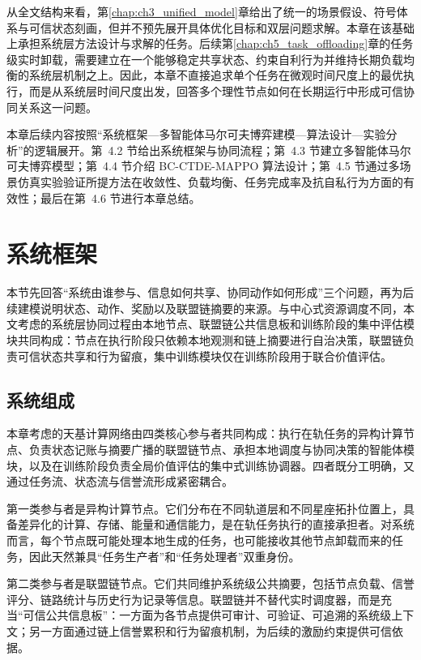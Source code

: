 从全文结构来看，第\ref{chap:ch3_unified_model}章给出了统一的场景假设、符号体系与可信状态刻画，但并不预先展开具体优化目标和双层问题求解。本章在该基础上承担系统层方法设计与求解的任务。后续第\ref{chap:ch5_task_offloading}章的任务级实时卸载，需要建立在一个能够稳定共享状态、约束自利行为并维持长期负载均衡的系统层机制之上。因此，本章不直接追求单个任务在微观时间尺度上的最优执行，而是从系统层时间尺度出发，回答多个理性节点如何在长期运行中形成可信协同关系这一问题。

本章后续内容按照“系统框架—多智能体马尔可夫博弈建模—算法设计—实验分析”的逻辑展开。第~4.2 节给出系统框架与协同流程；第~4.3 节建立多智能体马尔可夫博弈模型；第~4.4 节介绍 BC-CTDE-MAPPO 算法设计；第~4.5 节通过多场景仿真实验验证所提方法在收敛性、负载均衡、任务完成率及抗自私行为方面的有效性；最后在第~4.6 节进行本章总结。


\section{系统框架}

本节先回答“系统由谁参与、信息如何共享、协同动作如何形成”三个问题，再为后续建模说明状态、动作、奖励以及联盟链摘要的来源。与中心式资源调度不同，本文考虑的系统层协同过程由本地节点、联盟链公共信息板和训练阶段的集中评估模块共同构成：节点在执行阶段只依赖本地观测和链上摘要进行自治决策，联盟链负责可信状态共享和行为留痕，集中训练模块仅在训练阶段用于联合价值评估。

\subsection{系统组成}

本章考虑的天基计算网络由四类核心参与者共同构成：执行在轨任务的异构计算节点、负责状态记账与摘要广播的联盟链节点、承担本地调度与协同决策的智能体模块，以及在训练阶段负责全局价值评估的集中式训练协调器。四者既分工明确，又通过任务流、状态流与信誉流形成紧密耦合。

第一类参与者是异构计算节点。它们分布在不同轨道层和不同星座拓扑位置上，具备差异化的计算、存储、能量和通信能力，是在轨任务执行的直接承担者。对系统而言，每个节点既可能处理本地生成的任务，也可能接收其他节点卸载而来的任务，因此天然兼具“任务生产者”和“任务处理者”双重身份。

第二类参与者是联盟链节点。它们共同维护系统级公共摘要，包括节点负载、信誉评分、链路统计与历史行为记录等信息。联盟链并不替代实时调度器，而是充当“可信公共信息板”：一方面为各节点提供可审计、可验证、可追溯的系统级上下文；另一方面通过链上信誉累积和行为留痕机制，为后续的激励约束提供可信依据。

